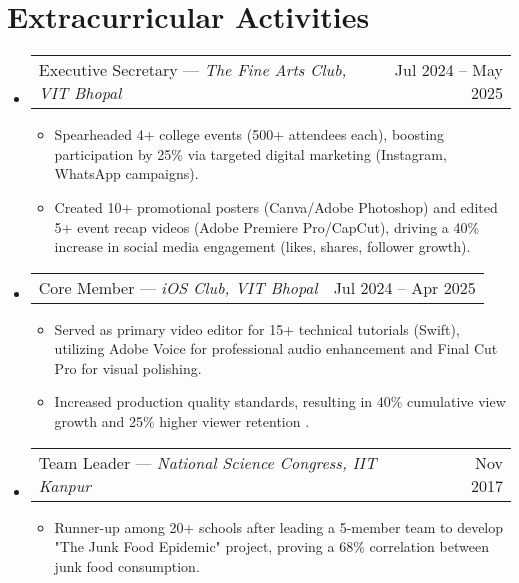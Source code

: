 \documentclass[letterpaper,10pt]{article}
\makeatletter
\newcommand{\resumeItem}[1]{
  \item\small{
    {#1 \vspace{-2pt}}
  }
}
\newcommand{\resumeProjectHeading}[2]{
    \item
    \begin{tabular*}{0.97\textwidth}{l@{\extracolsep{\fill}}r}
      \small#1 & #2 \\
    \end{tabular*}\vspace{-7pt}
}
\newcommand{\resumeSubHeadingListStart}{\begin{itemize}[leftmargin=0.15in, label={}]}
\newcommand{\resumeSubHeadingListEnd}{\end{itemize}}
\newcommand{\resumeItemListStart}{\begin{itemize}}
\newcommand{\resumeItemListEnd}{\end{itemize}\vspace{-5pt}}
\makeatother
\begin{document}
\section{Extracurricular Activities}
\resumeSubHeadingListStart
  \resumeProjectHeading
    {{Executive Secretary} — \emph{The Fine Arts Club, VIT Bhopal}}{Jul 2024 – May 2025}
    \resumeItemListStart
      \resumeItem{Spearheaded 4+ college events (500+ attendees each), boosting participation by 25\% via targeted digital marketing (Instagram, WhatsApp campaigns).}
      \resumeItem{Created 10+ promotional posters (Canva/Adobe Photoshop) and edited 5+ event recap videos (Adobe Premiere Pro/CapCut), driving a 40\% increase in social media engagement (likes, shares, follower growth).}
    \resumeItemListEnd
    
  \resumeProjectHeading
    {{Core Member} — \emph{iOS Club, VIT Bhopal}}{Jul 2024 – Apr 2025}
    \resumeItemListStart
      \resumeItem{Served as primary video editor for 15+ technical tutorials (Swift), utilizing Adobe Voice for professional audio enhancement and Final Cut Pro for visual polishing.}
      \resumeItem{Increased production quality standards, resulting in 40\% cumulative view growth and 25\% higher viewer retention .}
    \resumeItemListEnd
    
  \resumeProjectHeading
    {{Team Leader} — \emph{National Science Congress, IIT Kanpur}}{Nov 2017}
    \resumeItemListStart
      \resumeItem{Runner-up among 20+ schools after leading a 5-member team to develop "The Junk Food Epidemic" project, proving a 68\% correlation between junk food consumption.}

    \resumeItemListEnd
\resumeSubHeadingListEnd

\end{document}
